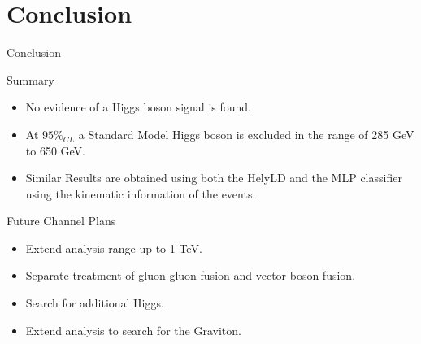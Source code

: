\section{Conclusion}

\begin{frame}{Conclusion}
\begin{center}
Summary
\begin{itemize}
\item
  No evidence of a Higgs boson signal is found.
\item
  At $95\%_{CL}$ a Standard Model Higgs boson is excluded in the range of 285 GeV to 650 GeV.
\item
  Similar Results are obtained using both the HelyLD and the MLP classifier using the kinematic information of the events.
\end{itemize}

\vspace{2em}

Future Channel Plans
\begin{itemize}
\item
  Extend analysis range up to 1 TeV.
\item
  Separate treatment of gluon gluon fusion and vector boson fusion.
\item
  Search for additional Higgs.
\item
  Extend analysis to search for the Graviton.
\end{itemize}

\end{center}
\end{frame}
